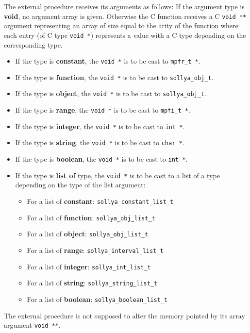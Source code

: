 \begin{itemize}
   The external procedure receives its arguments as follows: If the \sollya
   argument type is \textbf{void}, no argument array is given. Otherwise the C function
   receives a C \texttt{void **} argument representing an array of size equal to the
   arity of the function where each entry (of C type \texttt{void *}) represents a value
   with a C type depending on the corresponding \sollya type.\begin{itemize}
     \item If the \sollya type is \textbf{constant}, the \texttt{void *} is to be cast to \texttt{mpfr\_t *}.
     \item If the \sollya type is \textbf{function}, the \texttt{void *} is to be cast to
        \texttt{sollya\_obj\_t}.
     \item If the \sollya type is \textbf{object}, the \texttt{void *} is to be cast to \texttt{sollya\_obj\_t}.
     \item If the \sollya type is \textbf{range}, the \texttt{void *} is to be cast to \texttt{mpfi\_t *}.
     \item If the \sollya type is \textbf{integer}, the \texttt{void *} is to be cast to \texttt{int *}.
     \item If the \sollya type is \textbf{string}, the \texttt{void *} is to be cast to \texttt{char *}.
     \item If the \sollya type is \textbf{boolean}, the \texttt{void *} is to be cast to \texttt{int *}.
     \item If the \sollya type is \textbf{list of} type, the \texttt{void *} is to be cast to a list
        of a type depending on the type of the list argument:\begin{itemize}
          \item For a list of \textbf{constant}: \verb|sollya_constant_list_t|
          \item For a list of \textbf{function}: \verb|sollya_obj_list_t|
          \item For a list of \textbf{object}: \verb|sollya_obj_list_t|
          \item For a list of \textbf{range}: \verb|sollya_interval_list_t|
          \item For a list of \textbf{integer}: \verb|sollya_int_list_t|
          \item For a list of \textbf{string}: \verb|sollya_string_list_t|
          \item For a list of \textbf{boolean}: \verb|sollya_boolean_list_t| \end{itemize}
   \end{itemize}
   The external procedure is not supposed to alter the memory pointed by its
   array argument \texttt{void **}.
    

\end{itemize}
